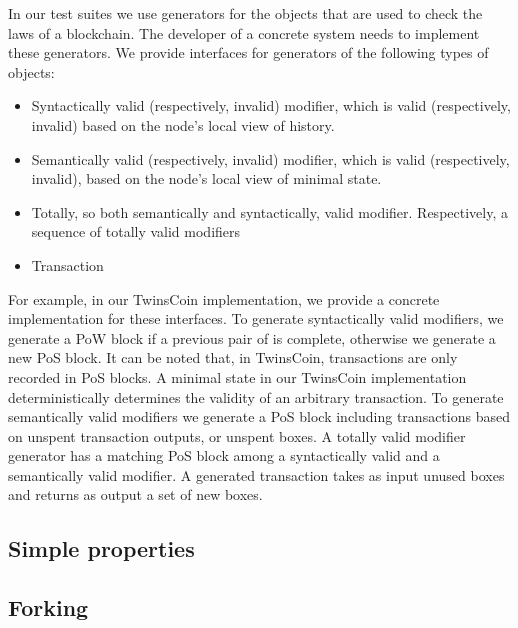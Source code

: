 In our test suites we use generators for the objects that are used to check the laws of a blockchain. The developer of a concrete system needs to implement these generators. We provide interfaces for generators of the following types of objects:

\begin{itemize}
	\item{Syntactically valid (respectively, invalid) modifier, which is valid (respectively, invalid) based on the node's local view of history.}
	\item{Semantically valid (respectively, invalid) modifier, which is valid (respectively, invalid), based on the node's local view of minimal state.}
	\item{Totally, so both semantically and syntactically, valid modifier. Respectively, a sequence of totally valid modifiers}
	\item{Transaction}
\end{itemize}

For example, in our TwinsCoin implementation, we provide a concrete implementation for these interfaces. To generate syntactically valid modifiers, we generate a PoW block if a previous pair of {\em<PoW block, PoS block>} is complete, otherwise we generate a new PoS block. It can be noted that, in TwinsCoin, transactions are only recorded in PoS blocks. A minimal state in our TwinsCoin implementation deterministically determines the validity of an arbitrary transaction. To generate semantically valid modifiers we generate a PoS block including transactions based on unspent transaction outputs, or unspent boxes. A totally valid modifier generator has a matching PoS block among a syntactically valid and a semantically valid modifier. A generated transaction takes as input unused boxes and returns as output a set of new boxes.

\subsection{Simple properties}

\subsection{Forking}



